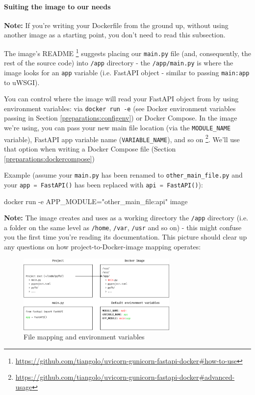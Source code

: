 \documentclass{article}
\newcommand{\flink}[1]{\footnote{\href{#1}{#1}}}
\newcommand{\note}{\textbf{\color{red}Note: }}
\newcommand{\pyinline}[1]{\lstinline[language=Python, style=cstyle, morekeywords={async}, basicstyle=\ttfamily\normalsize]{#1}}
\newcommand{\dockerinline}[1]{\lstinline[language=docker, style=cstyle, basicstyle=\ttfamily\normalsize]{#1}}
\begin{document}
\paragraph{Suiting the image to our needs}

\note If you're writing your Dockerfile from the ground up, without using another image as a starting point, you don't need to read this subsection.

The image's README \flink{https://github.com/tiangolo/uvicorn-gunicorn-fastapi-docker\#how-to-use} suggests placing our \texttt{main.py} file (and, consequently, the rest of the source code) into \texttt{/app} directory - the \texttt{/app/main.py} is where the image looks for an \pyinline{app} variable (i.e. FastAPI object - similar to passing \texttt{main:app} to uWSGI).

You can control where the image will read your FastAPI object from by using environment variables: via \dockerinline{docker run -e} (see Docker environment variables passing in Section \ref{preparations:configenv}) or Docker Compose. In the image we're using, you can pass your new main file location (via the \texttt{MODULE\_NAME} variable), FastAPI app variable name (\texttt{VARIABLE\_NAME}), and so on \flink{https://github.com/tiangolo/uvicorn-gunicorn-fastapi-docker\#advanced-usage}. We'll use that option when writing a Docker Compose file (Section \ref{preparations:dockercompose})

Example (assume your \texttt{main.py} has been renamed to \texttt{other\_main\_file.py} and your \pyinline{app = FastAPI()} has been replaced with \pyinline{api = FastAPI()}):

\begin{bashcode}
    docker run -e APP_MODULE="other_main_file:api" image
\end{bashcode}

\note The image creates and uses as a working directory the \texttt{/app} directory (i.e. a folder on the same level as \texttt{/home}, \texttt{/var}, \texttt{/usr} and so on) - this might confuse you the first time you're reading its documentation. This picture should clear up any questions on how project-to-Docker-image mapping operates:

\begin{figure}[h]
    \centering
    \includegraphics[width=0.7\textwidth]{img/docker_mapping.png}
    \caption{File mapping and environment variables}
\end{figure}
\end{document}
